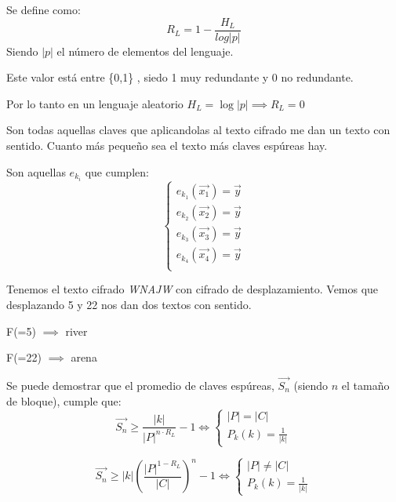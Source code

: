 \begin{defn}[Redundancia] Se define como:
 $$R_L = 1- \frac{H_L}{log |p|}$$
  Siendo $|p|$ el número de elementos del lenguaje.
  
  Este valor está entre \{0,1\} , siedo 1 muy redundante y 0 no redundante.
\end{defn}

Por lo tanto en un lenguaje aleatorio $H_L = \log |p| \implies R_L = 0$

\begin{defn}
	
	Son todas aquellas claves que aplicandolas al texto cifrado me dan un texto con sentido. Cuanto más pequeño sea el texto más claves espúreas hay.
	
	Son aquellas $e_{k_i}$ que cumplen:
	$$\begin{cases}
	 e_{k_1}(\overrightarrow{x_1}) = \overrightarrow{y}\\
	 e_{k_2}(\overrightarrow{x_2}) = \overrightarrow{y}\\
	 e_{k_3}(\overrightarrow{x_3}) = \overrightarrow{y}\\
	 e_{k_4}(\overrightarrow{x_4}) = \overrightarrow{y}\\
	\end{cases}$$
\end{defn}

\begin{example}
	Tenemos el texto cifrado \textit{WNAJW}  
	con cifrado de desplazamiento.
	Vemos que desplazando 5 y 22 nos dan dos textos con sentido.
	
	F(=5) $\implies$ river
	
	F(=22) $\implies$ arena
\end{example}

Se puede demostrar que el promedio de claves espúreas, $\overrightarrow{S_n}$ (siendo $n$ el tamaño de bloque), cumple que:
$$\overrightarrow{S_n} \geq \frac{|k|}{|P|^{n\cdot R_L}} -1 \iff \begin{cases}
	 |P| = |C|\\P_k(k) = \frac{1}{|k|}
\end{cases}$$

$$\overrightarrow{S_n} \geq |k| \left(\frac{|P|^{1-R_L}}{|C|}\right)^n -1 \iff \begin{cases}
|P| \neq |C|\\P_k(k) = \frac{1}{|k|}
\end{cases}$$

